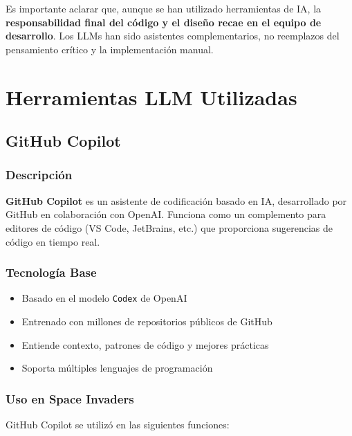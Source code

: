 \documentclass[12pt, a4paper]{article}
\begin{document}
Es importante aclarar que, aunque se han utilizado herramientas de IA, la \textbf{responsabilidad final del código y el diseño recae en el equipo de desarrollo}. Los LLMs han sido asistentes complementarios, no reemplazos del pensamiento crítico y la implementación manual.

\section{Herramientas LLM Utilizadas}

\subsection{GitHub Copilot}

\subsubsection{Descripción}

\textbf{GitHub Copilot} es un asistente de codificación basado en IA, desarrollado por GitHub en colaboración con OpenAI. Funciona como un complemento para editores de código (VS Code, JetBrains, etc.) que proporciona sugerencias de código en tiempo real.

\subsubsection{Tecnología Base}

\begin{itemize}[leftmargin=2em]
    \item Basado en el modelo \texttt{Codex} de OpenAI
    \item Entrenado con millones de repositorios públicos de GitHub
    \item Entiende contexto, patrones de código y mejores prácticas
    \item Soporta múltiples lenguajes de programación
\end{itemize}

\subsubsection{Uso en Space Invaders}

GitHub Copilot se utilizó en las siguientes funciones:
\end{document}
